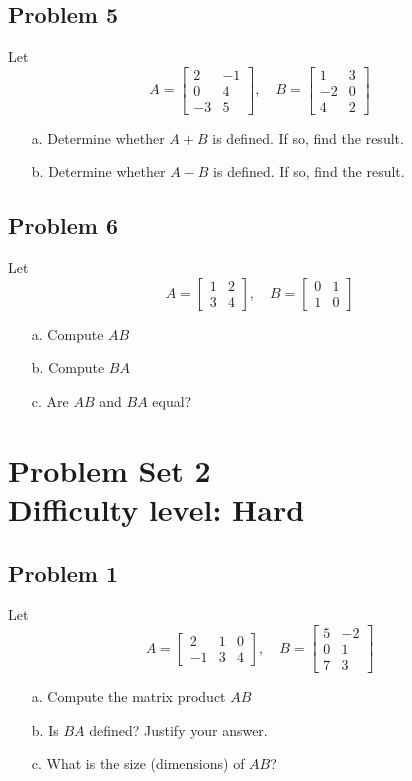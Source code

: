 \documentclass[12pt]{article}
\begin{document}
\subsection*{Problem 5}
Let
\[
A = \begin{bmatrix}
2 & -1 \\
0 & 4 \\
-3 & 5
\end{bmatrix}, \quad
B = \begin{bmatrix}
1 & 3 \\
-2 & 0 \\
4 & 2
\end{bmatrix}
\]

\begin{enumerate}
    \item[a.] Determine whether \( A + B \) is defined. If so, find the result.
    \item[b.] Determine whether \( A - B \) is defined. If so, find the result.
\end{enumerate}

\subsection*{Problem 6}
Let
\[
A = \begin{bmatrix}
1 & 2 \\
3 & 4
\end{bmatrix}, \quad
B = \begin{bmatrix}
0 & 1 \\
1 & 0
\end{bmatrix}
\]

\begin{enumerate}
    \item[a.] Compute \( AB \)
    \item[b.] Compute \( BA \)
    \item[c.] Are \( AB \) and \( BA \) equal?
\end{enumerate}

\section*{Problem Set 2\\Difficulty level: Hard}
\subsection*{Problem 1}
Let
\[
A = \begin{bmatrix}
2 & 1 & 0 \\
-1 & 3 & 4
\end{bmatrix}, \quad
B = \begin{bmatrix}
5 & -2 \\
0 & 1 \\
7 & 3
\end{bmatrix}
\]

\begin{enumerate}
    \item[a.] Compute the matrix product \( AB \)
    \item[b.] Is \( BA \) defined? Justify your answer.
    \item[c.] What is the size (dimensions) of \( AB \)?
\end{enumerate}
\end{document}
